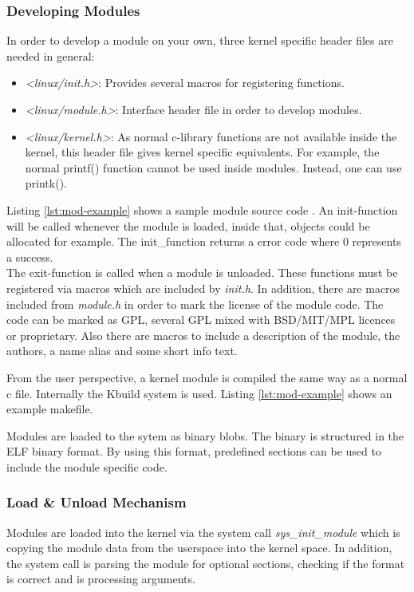 \documentclass{sig-alternate-05-2015}
\begin{document}
\subsubsection{Developing Modules}
In order to develop a module on your own, three kernel specific header files are needed in general:
\begin{itemize}
\item \emph{<linux/init.h>}: Provides several macros for registering functions.
\item \emph{<linux/module.h>}: Interface header file in order to develop modules.
\item \emph{<linux/kernel.h>}: As normal c-library functions are not available inside the kernel, this header file gives kernel specific equivalents. For example, the normal printf() function cannot be used inside modules. Instead, one can use printk().
\end{itemize}
 Listing \ref{lst:mod-example} shows a sample module source code .
An init-function will be called whenever the module is loaded, inside that, objects could be allocated for example. The init\_function returns a error code where  0 represents a success. \\
The exit-function is called when a module is unloaded. 
These functions must be registered via macros which are included by \emph{init.h}.  In addition, there are macros included from \emph{module.h} in order to mark the license of the module code. The code can be marked as GPL, several GPL mixed with BSD/MIT/MPL licences or proprietary. Also there are macros to include a description of the module, the authors, a name alias and some short info text.




From the user perspective, a kernel module is compiled the same way as a normal c file. Internally the Kbuild system is used. Listing \ref{lst:mod-example} shows an example makefile.



Modules are loaded to the sytem as binary blobs. The binary is structured in the ELF binary format. By using this format, predefined sections can be used to include the module specific code. \\


\subsubsection{Load \& Unload Mechanism}
Modules are loaded into the kernel via the system call \emph{sys\_init\_module} which is copying the module data from the userspace into the kernel space. In addition, the system call is parsing the module for optional sections, checking if the format is correct and is processing arguments. 
\end{document}
